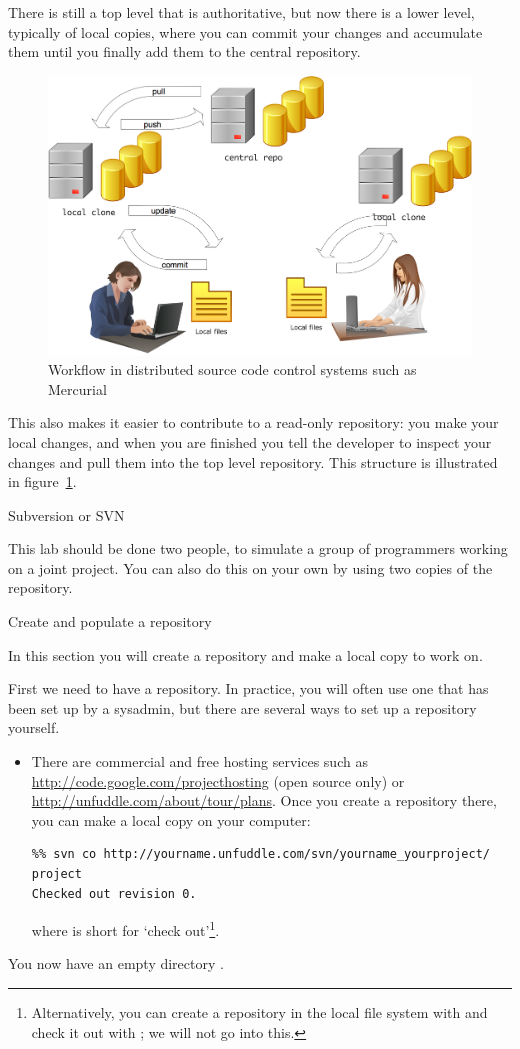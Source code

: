 There is still a top level that is authoritative, but
now there is a lower level, typically of local copies, where you can
commit your changes and accumulate them until you finally add them to
the central repository.
\begin{figure}[ht]
\includegraphics[scale=.19]{graphics-public/repo-flow-hg}
\caption{Workflow in distributed source code control systems such as Mercurial}
\label{fig:hg}
\end{figure}
This also makes it easier to contribute to a read-only repository:
you make your local changes, and when you are finished you tell the 
developer to inspect your changes and pull them into the top level 
repository. This structure is illustrated in figure~\ref{fig:hg}.

 {Subversion or SVN}

This lab should be done two people, to simulate a group of programmers
working on a joint project. You can also do this on your own by using
two copies of the repository.

 {Create and populate a repository}

\begin{purpose}
  In this section you will create a repository and make a local copy
  to work on.
\end{purpose}

First we need to have a repository. In practice, you will often use
one that has been set up by a sysadmin, but there are several ways to
set up a repository yourself.
\begin{itemize}
\item There are commercial and free hosting services such as
  \url{http://code.google.com/projecthosting} (open source only) or 
  \url{http://unfuddle.com/about/tour/plans}. Once you create a
  repository there, you can make a local copy on your computer:
\begin{verbatim}
%% svn co http://yourname.unfuddle.com/svn/yourname_yourproject/ project
Checked out revision 0.
\end{verbatim}
where  is short for `check out'\footnote{Alternatively, you can create a repository in the local file system with  and check it out with ; we will not go into this.}.
\end{itemize}
You now have an empty directory .

